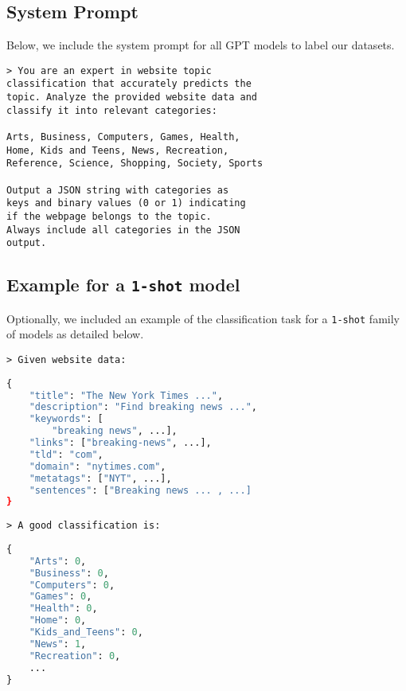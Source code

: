 \subsection{System Prompt}\label{app:system-prompt}
Below, we include the system prompt for all GPT models to label our datasets.

\begin{verbatim}
> You are an expert in website topic 
classification that accurately predicts the 
topic. Analyze the provided website data and 
classify it into relevant categories:

Arts, Business, Computers, Games, Health, 
Home, Kids and Teens, News, Recreation, 
Reference, Science, Shopping, Society, Sports

Output a JSON string with categories as
keys and binary values (0 or 1) indicating 
if the webpage belongs to the topic. 
Always include all categories in the JSON 
output.
\end{verbatim}

\subsection{Example for a \texttt{1-shot} model}\label{app:example-1-shot}
Optionally, we included an example of the classification task for a \texttt{1-shot} family
of models as detailed below.

\begin{verbatim}
> Given website data:
\end{verbatim}

\begin{lstlisting}[showstringspaces=false,language=Python]
{         
    "title": "The New York Times ...",
    "description": "Find breaking news ...",
    "keywords": [
        "breaking news", ...],
    "links": ["breaking-news", ...],
    "tld": "com",
    "domain": "nytimes.com",
    "metatags": ["NYT", ...],
    "sentences": ["Breaking news ... , ...]
}
\end{lstlisting}

\begin{verbatim}
> A good classification is:
\end{verbatim}

\begin{lstlisting}[showstringspaces=false,language=Python]
{
    "Arts": 0,
    "Business": 0,
    "Computers": 0,
    "Games": 0,
    "Health": 0,
    "Home": 0,
    "Kids_and_Teens": 0,
    "News": 1,
    "Recreation": 0,
    ...
}
\end{lstlisting}
